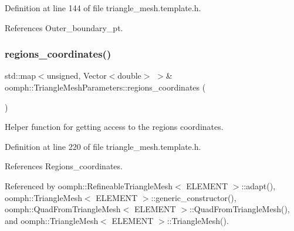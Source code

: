 Definition at line 144 of file triangle\+\_\+mesh.\+template.\+h.



References Outer\+\_\+boundary\+\_\+pt.

\mbox{\label{classoomph_1_1TriangleMeshParameters_ad89d2f2d75fa7d430a3ca02fbd4b64f8}} 
\subsubsection{\texorpdfstring{regions\+\_\+coordinates()}{regions\_coordinates()}}
{\footnotesize\ttfamily std\+::map$<$unsigned, Vector$<$double$>$ $>$\& oomph\+::\+Triangle\+Mesh\+Parameters\+::regions\+\_\+coordinates (\begin{DoxyParamCaption}{ }\end{DoxyParamCaption})\hspace{0.3cm}{\ttfamily [inline]}}



Helper function for getting access to the regions coordinates. 



Definition at line 220 of file triangle\+\_\+mesh.\+template.\+h.



References Regions\+\_\+coordinates.



Referenced by oomph\+::\+Refineable\+Triangle\+Mesh$<$ E\+L\+E\+M\+E\+N\+T $>$\+::adapt(), oomph\+::\+Triangle\+Mesh$<$ E\+L\+E\+M\+E\+N\+T $>$\+::generic\+\_\+constructor(), oomph\+::\+Quad\+From\+Triangle\+Mesh$<$ E\+L\+E\+M\+E\+N\+T $>$\+::\+Quad\+From\+Triangle\+Mesh(), and oomph\+::\+Triangle\+Mesh$<$ E\+L\+E\+M\+E\+N\+T $>$\+::\+Triangle\+Mesh().

\mbox{\label{classoomph_1_1TriangleMeshParameters_a9bcb1b69f601f277d2498c694dfb008c}} 
